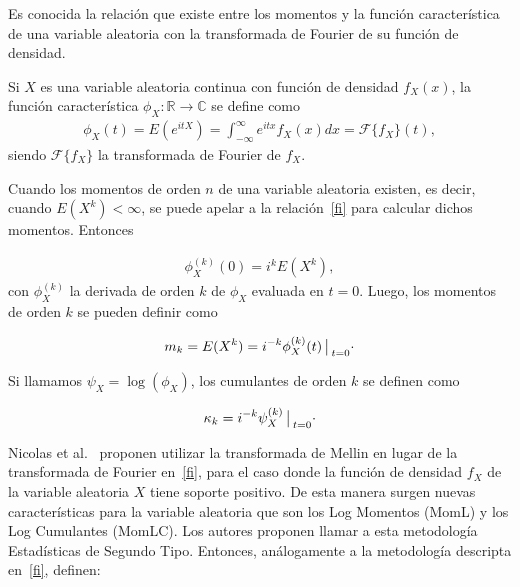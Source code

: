 Es conocida la relación que existe entre los momentos y la función característica de una variable aleatoria con la transformada de Fourier de su función de densidad. 

\begin{definition}
Si $X$ es una variable aleatoria continua con función de densidad $f_X(x)$, la función característica $\phi_X: \mathbb{R} \rightarrow \mathbb{C}$ se define como 
\begin{align}
\phi_X(t)=E(e^{itX})=\int_{-\infty}^{\infty} e^{itx} f_X(x) dx = \mathcal{F}\{f_X\}(t),
\label{fi}
\end{align}
siendo $\mathcal{F}\{f_X\}$ la transformada de Fourier de $f_X$.
\end{definition}

Cuando los momentos de orden $n$ de una variable aleatoria existen, es decir, cuando $E(X^k)< \infty$, se puede apelar a la relación~\eqref{fi} para calcular dichos momentos. Entonces

\begin{align}
\phi_X^{(k)}(0)=i^k E(X^k),
\label{fi}
\end{align}
con $\phi_X^{(k)}$ la derivada de orden $k$ de $\phi_X$ evaluada en $t=0$. Luego, los momentos de orden $k$ se pueden definir como 

\begin{align}
\label{MomentosPrimerTipo}
m_k=E(X^k)=i^{-k} \phi_X^{(k)}(t)\big\arrowvert _{t=0}\cdot
\end{align}

Si llamamos $\psi_X=\log(\phi_X)$, los cumulantes de orden $k$ se definen como 

\begin{align}
\label{CumulantePrimerTipo}
\kappa_k=i^{-k} \psi_X^{(k)}\big\arrowvert _{t=0}\cdot
\end{align}

Nicolas et al.~\cite{nicolas2002} proponen utilizar la transformada de Mellin en lugar de la transformada de Fourier en~\eqref{fi}, para el caso donde la función de densidad $f_X$ de la variable aleatoria $X$ tiene soporte positivo. De esta manera surgen nuevas características para la variable aleatoria que son los Log Momentos (MomL) y los Log Cumulantes (MomLC). Los autores proponen llamar a esta metodología Estadísticas de Segundo Tipo. Entonces, análogamente a la metodología descripta en~\ref{fi}, definen:


